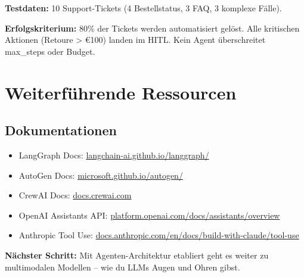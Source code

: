 \textbf{Testdaten:} 10 Support-Tickets (4 Bestellstatus, 3 FAQ, 3 komplexe Fälle).

\textbf{Erfolgskriterium:} 80\% der Tickets werden automatisiert gelöst. Alle kritischen Aktionen (Retoure > €100) landen im HITL. Kein Agent überschreitet max\_steps oder Budget.

\section{Weiterführende Ressourcen}

\subsection{Dokumentationen}

\begin{itemize}[leftmargin=*]
    \item LangGraph Docs: \href{https://langchain-ai.github.io/langgraph/}{langchain-ai.github.io/langgraph/}
    \item AutoGen Docs: \href{https://microsoft.github.io/autogen/}{microsoft.github.io/autogen/}
    \item CrewAI Docs: \href{https://docs.crewai.com}{docs.crewai.com}
    \item OpenAI Assistants API: \href{https://platform.openai.com/docs/assistants/overview}{platform.openai.com/docs/assistants/overview}
    \item Anthropic Tool Use: \href{https://docs.anthropic.com/en/docs/build-with-claude/tool-use}{docs.anthropic.com/en/docs/build-with-claude/tool-use}
\end{itemize}


\textbf{Nächster Schritt:} Mit Agenten-Architektur etabliert geht es weiter zu multimodalen Modellen -- wie du LLMs Augen und Ohren gibst.
\endinput

\clearpage
